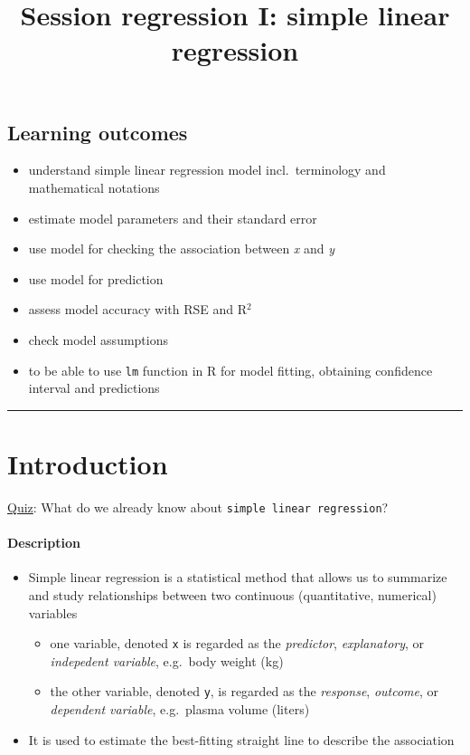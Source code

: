 \documentclass[]{article}
\title{Session regression I: simple linear regression}
\author{}
\date{}
\providecommand{\tightlist}{%
  \setlength{\itemsep}{0pt}\setlength{\parskip}{0pt}}
\let\oldparagraph\paragraph
\renewcommand{\paragraph}[1]{\oldparagraph{#1}\mbox{}}
\begin{document}
\maketitle

\hypertarget{learning-outcomes}{%
\subsection{Learning outcomes}\label{learning-outcomes}}

\begin{itemize}
\tightlist
\item
  understand simple linear regression model incl.~terminology and
  mathematical notations
\item
  estimate model parameters and their standard error
\item
  use model for checking the association between \emph{x} and \emph{y}
\item
  use model for prediction
\item
  assess model accuracy with RSE and R\(^2\)
\item
  check model assumptions
\item
  to be able to use \texttt{lm} function in R for model fitting,
  obtaining confidence interval and predictions
\end{itemize}

\begin{center}\rule{0.5\linewidth}{\linethickness}\end{center}

\hypertarget{introduction}{%
\section{Introduction}\label{introduction}}

\href{https://forms.gle/bHZr1MP454npysAFA}{Quiz}: What do we already
know about \texttt{simple\ linear\ regression}?

\hypertarget{description}{%
\paragraph{Description}\label{description}}

\begin{itemize}
\tightlist
\item
  Simple linear regression is a statistical method that allows us to
  summarize and study relationships between two continuous
  (quantitative, numerical) variables

  \begin{itemize}
  \tightlist
  \item
    one variable, denoted \texttt{x} is regarded as the
    \emph{predictor}, \emph{explanatory}, or \emph{indepedent variable},
    e.g.~body weight (kg)
  \item
    the other variable, denoted \texttt{y}, is regarded as the
    \emph{response}, \emph{outcome}, or \emph{dependent variable},
    e.g.~plasma volume (liters)
  \end{itemize}
\item
  It is used to estimate the best-fitting straight line to describe the
  association
\end{itemize}
\end{document}
